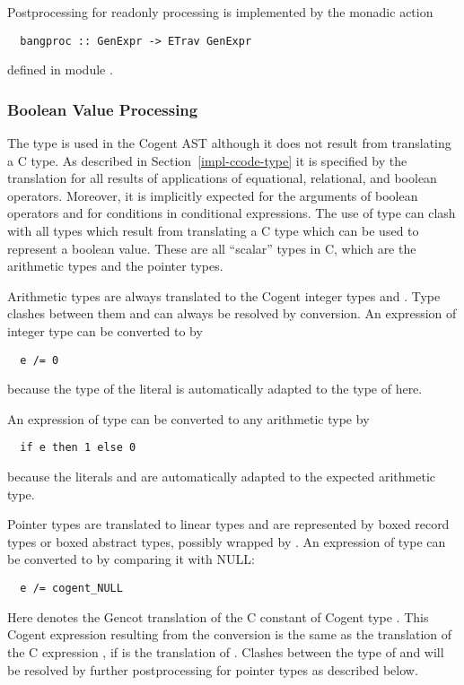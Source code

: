 Postprocessing for readonly processing is implemented by the monadic action
\begin{verbatim}
  bangproc :: GenExpr -> ETrav GenExpr
\end{verbatim}
defined in module .

\subsubsection{Boolean Value Processing}

The type  is used in the Cogent AST although it does not result from translating a C type. As described in
Section~\ref{impl-ccode-type} it is specified by the translation for all results of applications of equational, relational,
and boolean operators. Moreover, it is implicitly expected for the arguments of boolean operators and for conditions in conditional
expressions. The use of type  can clash with all types which result from translating a C type which can be used to
represent a boolean value. These are all ``scalar'' types in C, which are the arithmetic types and the pointer types.

Arithmetic types are always translated to the Cogent integer types  and . Type clashes between
them and  can always be resolved by conversion. An expression  of integer type can be converted
to  by
\begin{verbatim}
  e /= 0
\end{verbatim}
because the type of the literal  is automatically adapted to the type of  here.

An expression  of type  can be converted to any arithmetic type by
\begin{verbatim}
  if e then 1 else 0
\end{verbatim}
because the literals  and  are automatically adapted to the expected arithmetic type.

Pointer types are translated to linear types and are represented by boxed record types or boxed abstract types, possibly wrapped
by . An expression  of type  can be converted to  by comparing it with NULL:
\begin{verbatim}
  e /= cogent_NULL
\end{verbatim}
Here  denotes the Gencot translation of the C constant  of Cogent type . This
Cogent expression resulting from the conversion is the same as the translation of the C expression , if
 is the translation of . Clashes between the type of  and  will be resolved
by further postprocessing for pointer types as described below.

